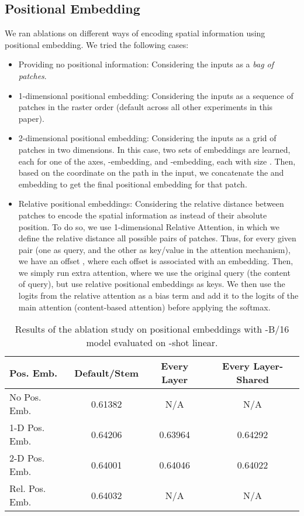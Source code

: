 \subsection{Positional Embedding}
\label{app:pos_emb}

We ran ablations on different ways of encoding spatial information using positional embedding. We tried the following cases:
\begin{itemize}
    \item Providing no positional information: Considering the inputs as a \emph{bag of patches}.
    \item 1-dimensional positional embedding: Considering the inputs as a sequence of patches in the raster order (default across all other experiments in this paper).
    \item 2-dimensional positional embedding: Considering the inputs as a grid of patches in two dimensions. In this case, two sets of embeddings are learned, each for one of the axes, -embedding, and -embedding, each with size . Then, based on the coordinate on the path in the input, we concatenate the  and  embedding to get the final positional embedding for that patch.
    \item Relative positional embeddings:  Considering the relative distance between patches to encode the spatial information as instead of their absolute position. To do so, we use 1-dimensional Relative Attention, in which we define the relative distance all possible pairs of patches. Thus, for every given pair (one as query, and the other as key/value in the attention mechanism), we have an offset , where each offset is associated with an embedding. Then, we simply run extra attention, where we use the original query (the content of query), but use relative positional embeddings as keys. We then use the logits from the relative attention as a bias term and add it to the logits of the main attention (content-based attention) before applying the softmax. 
\end{itemize}



\begin{table}[t]
\centering
\begin{tabular}{l c c c}
\toprule
Pos. Emb. & Default/Stem & Every Layer & Every Layer-Shared \\
\midrule
No Pos. Emb. & 0.61382  & N/A & N/A \\
1-D Pos. Emb. & 0.64206 & 0.63964 & 0.64292 \\
2-D Pos. Emb. &  0.64001 & 0.64046  & 0.64022 \\
Rel. Pos. Emb. & 0.64032 & N/A & N/A \\
\bottomrule
\end{tabular}
\caption{Results of the ablation study on positional embeddings with \oursabbrv-B/16 model evaluated on -shot linear.}
\label{tbl:pos_emb_abblation}
\end{table}


